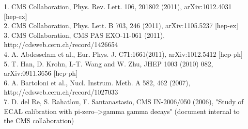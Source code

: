 \documentclass[10pt, a4paper]{article}
\begin{document}
1. CMS Collaboration, Phys. Rev. Lett. 106, 201802 (2011), arXiv:1012.4031 [hep-ex] \\ 
2. CMS Collaboration, Phys. Lett. B 703, 246 (2011), arXiv:1105.5237 [hep-ex] \\
3. CMS Collaboration, CMS PAS EXO-11-061 (2011), http://cdsweb.cern.ch/record/1426654  \\ 
4. A. Abdesselam et al., Eur. Phys. J. C71:1661(2011), arXiv:1012.5412 [hep-ph] \\
5. T. Han, D. Krohn, L-T. Wang and W. Zhu, JHEP 1003 (2010) 082, arXiv:0911.3656 [hep-ph] \\
6. A. Bartoloni et al., Nucl. Instrum. Meth. A 582, 462 (2007), http://cdsweb.cern.ch/record/1027033 \\
7. D. del Re, S. Rahatlou, F. Santanastasio,  CMS IN-2006/050 (2006), "Study of ECAL calibration with pi-zero-->gamma gamma decays"  (document internal to the CMS collaboration)\\

  

%

\end{document}
